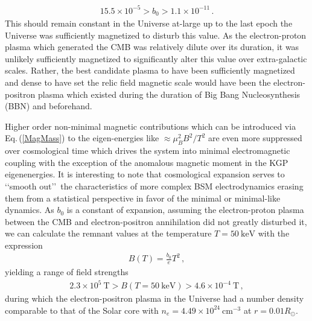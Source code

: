 \documentclass[universe,article,submit,moreauthors,pdftex,a4paper]{Definitions/mdpi}
\newcommand{\req}[1]{Eq.\,(\ref{#1})}
\begin{document}
\begin{alignat}{1}
    \label{BoScale} 5.5\times10^{-5}>b_{0}>1.1\times10^{-11}\,.
\end{alignat}
This should remain constant in the Universe at-large up to the last epoch the Universe was sufficiently magnetized to disturb this value. As the electron-proton plasma which generated the CMB was relatively dilute over its duration, it was unlikely sufficiently magnetized to significantly alter this value over extra-galactic scales. Rather, the best candidate plasma to have been sufficiently magnetized and dense to have set the relic field magnetic scale would have been the electron-positron plasma which existed during the duration of Big Bang Nucleosynthesis (BBN) and beforehand.

Higher order non-minimal magnetic contributions which can be introduced via \req{MagMass} to the eigen-energies like $\approx\mu_{B}^{2}B^{2}/T^{2}$ are even more suppressed over cosmological time which drives the system into minimal electromagnetic coupling with the exception of the anomalous magnetic moment in the KGP eigenenergies. It is interesting to note that cosmological expansion serves to \lq\lq smooth out\rq\rq\ the characteristics of more complex BSM electrodynamics erasing them from a statistical perspective in favor of the minimal or minimal-like dynamics. As $b_0$ is a constant of expansion, assuming the electron-proton plasma between the CMB and electron-positron annihilation did not greatly disturbed it, we can calculate the remnant values at the temperature $T=50\ \mathrm{keV}$ with the expression
\begin{align}
  \label{BBNFields} B(T)=\frac{b_{0}}{e}T^{2}\,,
\end{align}
yielding a range of field strengths
\begin{align}
  \label{BBNRange} 2.3\times10^{5}\ \mathrm{T}>B(T=50\ \mathrm{keV})>4.6\times10^{-4}\ \mathrm{T}\,,
\end{align}
during which the electron-positron plasma in the Universe had a number density comparable to that of the Solar core with $n_{e}=4.49\times10^{24}\ \mathrm{cm}^{-3}$ at $r=0.01R_{\odot}$.

\end{document}

